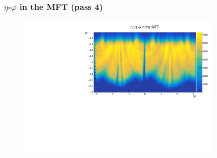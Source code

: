\documentclass[10pt]{beamer}
\begin{document}
\begin{frame}
    \frametitle{$\eta$-$\varphi$ in the MFT (pass 4)}
        \begin{figure}
            \begin{center}
                \includegraphics[width=0.9\textwidth]{Plots/pass4_MFT/eta_phi_pass4.pdf}
            \end{center}
        \end{figure}
\end{frame}
\end{document}
